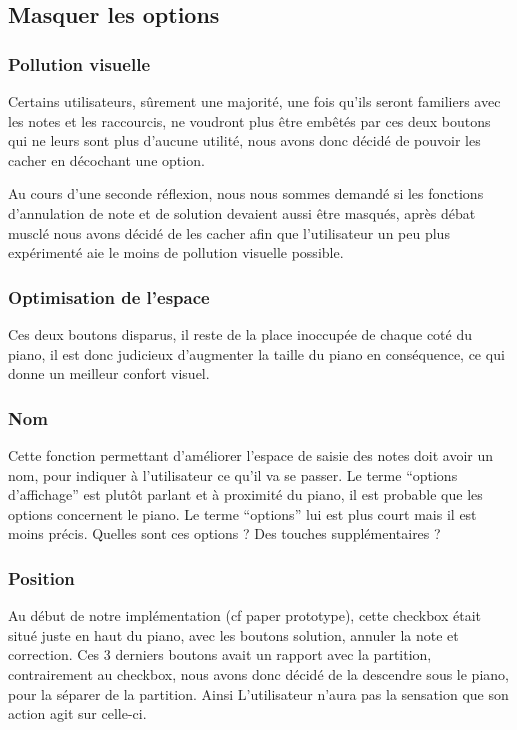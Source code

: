 \documentclass{article}
\begin{document}
\subsection{Masquer les options}
\subsubsection{Pollution visuelle}
Certains utilisateurs, sûrement une majorité, une fois qu'ils seront familiers avec les notes et les raccourcis, ne voudront plus 
être embêtés par ces deux boutons qui ne leurs sont plus d'aucune utilité, nous avons donc décidé de pouvoir les cacher en décochant
une option.


Au cours d'une seconde réflexion, nous nous sommes demandé si les fonctions d'annulation de note et de solution devaient aussi 
être masqués, après débat musclé nous avons décidé de les cacher afin que l'utilisateur un peu plus expérimenté aie le moins de 
pollution  visuelle possible.
\subsubsection{Optimisation de l'espace}
Ces deux boutons disparus, il reste de la place inoccupée de chaque coté du piano, il est donc judicieux d'augmenter la taille 
du piano en conséquence, ce qui donne un meilleur confort visuel.

\subsubsection{Nom}
Cette fonction permettant d'améliorer l'espace de saisie des notes doit avoir un nom, pour indiquer à l'utilisateur ce qu'il va se 
passer. Le terme ``options d'affichage'' est plutôt parlant et à proximité du piano, il est probable que les options concernent le 
piano.
Le terme ``options'' lui est plus court mais il est moins précis. Quelles sont ces options ? Des touches supplémentaires ?

\subsubsection{Position}
Au début de notre implémentation (cf paper prototype), cette checkbox était situé juste en haut du piano, avec les boutons
solution, annuler la note et correction. Ces 3 derniers boutons avait un rapport avec la partition, contrairement au checkbox,
nous avons donc décidé de la descendre sous le piano, pour la séparer de la partition. Ainsi L'utilisateur n'aura pas la sensation que
son action agit sur celle-ci.
\end{document}
